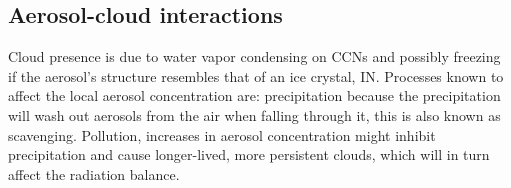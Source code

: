 \subsection{Aerosol-cloud interactions}

Cloud presence is due to water vapor condensing on CCNs and possibly freezing if the aerosol's structure resembles that of an ice crystal, IN. Processes known to affect the local aerosol concentration are: precipitation because the precipitation will wash out aerosols from the air when falling through it, this is also known as scavenging. Pollution, increases in aerosol concentration might inhibit precipitation and cause longer-lived, more persistent clouds, which will in turn affect the radiation balance.

